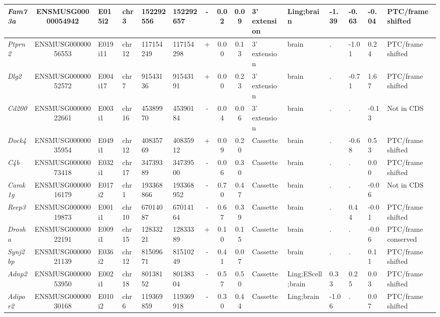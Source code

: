 \begin{appendices}
\begin{landscape}
\begin{table}[htbp]
{\begin{tabular}{|l|c|l|l|l|l|c|c|c|l|l|l|l|l|l|}
		\textit{Fam73a} & ENSMUSG00000054942 & E015i2 & chr3  & 152292556 & 152292657 & -     & 0.02  & 0.09  & 3' extension & Ling;brain & -1.39 & -0.63 & -0.04 & PTC/frame shifted \\ \hline
		\textit{Ptprn2} & ENSMUSG00000056553 & E019i11 & chr12 & 117154249 & 117154298 & +     & 0.00  & 0.13  & 3' extension & brain & .     & -1.01 & 0.24  & PTC/frame shifted \\ \hline
		\textit{Dlg2} & ENSMUSG00000052572 & E004i17 & chr7  & 91543136 & 91543191 & +     & 0.00  & 0.23  & 3' extension & brain & .     & -0.71 & 1.67  & PTC/frame shifted \\ \hline
		\textit{Cd200} & ENSMUSG00000022661 & E003i1 & chr16 & 45389970 & 45390184 & -     & 0.04  & 0.06  & 3' extension & brain & .     & .     & -0.13 & Not in CDS \\ \hline
		\textit{Dock4} & ENSMUSG00000035954 & E049i1 & chr12 & 40835769 & 40835912 & +     & 0.09  & 0.20  & Cassette & brain & .     & -0.68 & 0.53  & PTC/frame shifted \\ \hline
		\textit{C4b} & ENSMUSG00000073418 & E032i1 & chr17 & 34739389 & 34739500 & -     & 0.06  & 0.30  & Cassette & brain & .     & .     & 0.00  & PTC/frame shifted \\ \hline
		\textit{Camk1g} & ENSMUSG00000016179 & E017i2 & chr1  & 193368866 & 193368952 & -     & 0.70  & 0.47  & Cassette & brain & .     & .     & -0.06 & Not in CDS  \\ \hline
		\textit{Reep3} & ENSMUSG00000019873 & E001i1 & chr10 & 67014087 & 67014164 & -     & 0.67  & 0.39  & Cassette & brain & .     & 0.44  & -0.01 & PTC/frame shifted \\ \hline
		\textit{Drosha} & ENSMUSG00000022191 & E009i1 & chr15 & 12833221 & 12833389 & +     & 0.10  & 0.15  & Cassette & brain & .     & .     & -0.06 & PTC/frame conserved \\ \hline
		\textit{Synj2bp} & ENSMUSG00000021139 & E036i2 & chr12 & 81509671 & 81510249 & -     & 0.41  & 0.07  & Cassette & brain & .     & .     & 0.11  & PTC/frame shifted \\ \hline
		\textit{Adnp2} & ENSMUSG00000053950 & E002i1 & chr18 & 80138152 & 80138304 & -     & 0.57  & 0.50  & Cassette & Ling;EScell;brain & 0.33  & 0.25  & 0.03  & PTC/frame shifted \\ \hline
		\textit{Adipor2} & ENSMUSG00000030168 & E010i2 & chr6  & 119369859 & 119369918 & -     & 0.30  & 0.44  & Cassette & Ling;brain & -1.06 & .     & 0.07  & PTC/frame shifted \\ \hline

\end{tabular}}
\end{table}
\end{landscape}
\end{appendices}
